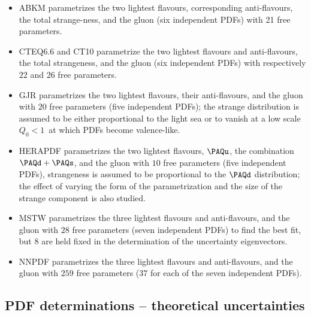 \begin{itemize}
  
\item ABKM parametrizes the two lightest flavours, corresponding
  anti-flavours, the total strange-ness, and the gluon (six independent
  PDFs) with 21 free parameters.
\item CTEQ6.6 and CT10  parametrize  the two lightest flavours and
  anti-flavours, the total strangeness, and the gluon (six independent
  PDFs) with respectively $22$ and $26$ free parameters.
\item GJR parametrizes the two lightest flavours, their anti-flavours,
  and the gluon with $20$ free parameters (five independent PDFs); the
  strange distribution is assumed to be either proportional to the
  light sea or to vanish at a low scale $Q_0<1$\UGeV\ at which PDFs become valence-like.
\item HERAPDF parametrizes the two lightest flavours, $\PAQu$,
  the combination $\PAQd + \PAQs$, and the gluon with $10$ free
  parameters (five independent PDFs), strangeness is assumed to be
  proportional to the $\PAQd$ distribution; the
  effect of varying the form of the parametrization and the  
  size of the strange component is also studied.  
\item  MSTW parametrizes the three lightest flavours and anti-flavours, and
  the gluon with $28$ free parameters (seven independent PDFs) to find
  the best fit, but $8$ are held fixed in the determination of the uncertainty eigenvectors.
\item NNPDF parametrizes the three lightest flavours and
  anti-flavours, and the gluon with $259$ free parameters ($37$ for
  each of the seven independent PDFs).

\end{itemize}


\subsection{PDF determinations -- theoretical uncertainties}
\label{sec:pdfdet2}


